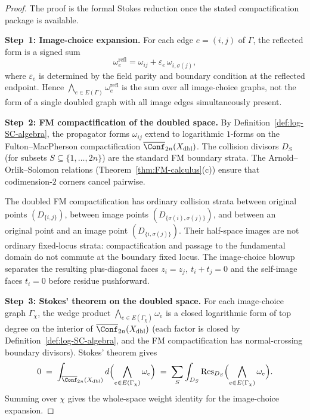 \begin{proof}
The proof is the formal Stokes reduction once the stated
compactification package is available.

\medskip\noindent\textbf{Step~1: Image-choice expansion.}
For each edge $e=(i,j)$ of $\Gamma$, the reflected form is a signed
sum
\[
\omega^{\mathrm{refl}}_e
=
\omega_{ij}+\varepsilon_e\,\omega_{i,\sigma(j)},
\]
where $\varepsilon_e$ is determined by the field parity and boundary
condition at the reflected endpoint. Hence
$\bigwedge_{e\in E(\Gamma)}\omega_e^{\mathrm{refl}}$ is the sum over
all image-choice graphs, not the form of a single doubled graph with
all image edges simultaneously present.

\medskip\noindent\textbf{Step~2: FM compactification of the doubled
space.}
By Definition~\ref{def:log-SC-algebra}, the propagator forms $\omega_{ij}$ extend to
logarithmic $1$-forms on the Fulton--MacPherson compactification
$\overline{\Conf}_{2n}(X_{\mathrm{dbl}})$. The collision divisors
$D_S$ (for subsets $S\subseteq\{1,\ldots,2n\}$) are the standard
FM boundary strata. The Arnold--Orlik--Solomon relations (Theorem~\ref{thm:FM-calculus}(c)) ensure
that codimension-$2$ corners cancel pairwise.

The doubled FM compactification has ordinary collision strata between
original points $(D_{\{i,j\}})$, between image points
$(D_{\{\sigma(i),\sigma(j)\}})$, and between an original point and an
image point $(D_{\{i,\sigma(j)\}})$. Their half-space images are not
ordinary fixed-locus strata: compactification and passage to the
fundamental domain do not commute at the boundary fixed locus. The
image-choice blowup separates the resulting plus-diagonal faces
$z_i=z_j,\ t_i+t_j=0$ and the self-image faces $t_i=0$ before
residue pushforward.

\medskip\noindent\textbf{Step~3: Stokes' theorem on the doubled
space.}
For each image-choice graph $\Gamma_\chi$, the wedge product
$\bigwedge_{e\in E(\Gamma_\chi)}\omega_e$ is a closed
logarithmic form of top degree on the interior of
$\overline{\Conf}_{2n}(X_{\mathrm{dbl}})$ (each factor is closed by
Definition~\ref{def:log-SC-algebra}, and the FM compactification has normal-crossing boundary
divisors). Stokes' theorem gives
\begin{equation}\label{eq:stokes-doubled}
0
\;=\;
\int_{\overline{\Conf}_{2n}(X_{\mathrm{dbl}})}
d\Bigl(\bigwedge_{e\in E(\Gamma_\chi)}\omega_e\Bigr)
\;=\;
\sum_{S}\int_{D_S}
\operatorname{Res}_{D_S}\Bigl(
\bigwedge_{e\in E(\Gamma_\chi)}\omega_e\Bigr).
\end{equation}
Summing over $\chi$ gives the whole-space weight identity for the
image-choice expansion.


\end{proof}
